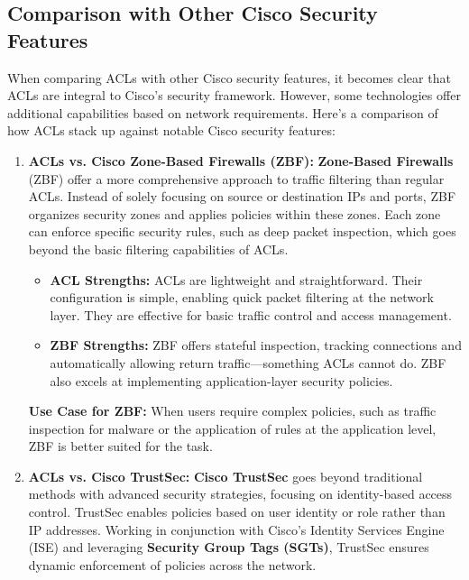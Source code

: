 \documentclass[11pt,a4paper]{article}
\begin{document}
    \subsection*{Comparison with Other Cisco Security Features}
    When comparing ACLs with other Cisco security features, it becomes clear that ACLs are integral to Cisco's security framework. However, some technologies offer additional capabilities based on network requirements. Here's a comparison of how ACLs stack up against notable Cisco security features:
        \begin{enumerate}
            \item \textbf{ACLs vs. Cisco Zone-Based Firewalls (ZBF):} \textbf{Zone-Based Firewalls} (ZBF) offer a more comprehensive approach to traffic filtering than regular ACLs. Instead of solely focusing on source or destination IPs and ports, ZBF organizes security zones and applies policies within these zones. Each zone can enforce specific security rules, such as deep packet inspection, which goes beyond the basic filtering capabilities of ACLs.
                \begin{itemize}
                    \item \textbf{ACL Strengths:} ACLs are lightweight and straightforward. Their configuration is simple, enabling quick packet filtering at the network layer. They are effective for basic traffic control and access management.

                    \item \textbf{ZBF Strengths:} ZBF offers stateful inspection, tracking connections and automatically allowing return traffic—something ACLs cannot do. ZBF also excels at implementing application-layer security policies.
                \end{itemize}
            
            \textbf{Use Case for ZBF:} When users require complex policies, such as traffic inspection for malware or the application of rules at the application level, ZBF is better suited for the task.

            \item \textbf{ACLs vs. Cisco TrustSec:} \textbf{Cisco TrustSec} goes beyond traditional methods with advanced security strategies, focusing on identity-based access control. TrustSec enables policies based on user identity or role rather than IP addresses. Working in conjunction with Cisco’s Identity Services Engine (ISE) and leveraging \textbf{Security Group Tags (SGTs)}, TrustSec ensures dynamic enforcement of policies across the network.
            

\end{enumerate}
\end{document}
